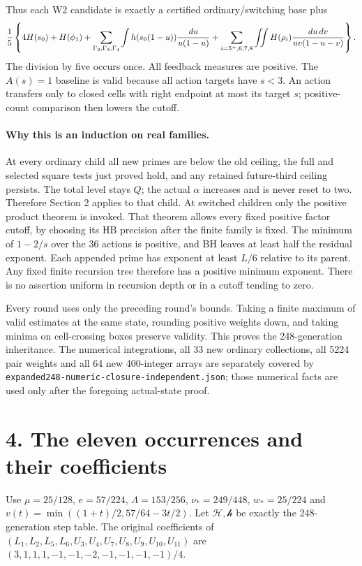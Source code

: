 \documentclass[11pt]{article}
\newcommand{\HH}{\mathcal H}
\newcommand{\hh}{\mathcal h}
\begin{document}
Thus each W2 candidate is exactly a certified ordinary/switching base
plus
\[
 {1\over5}\left\{4H(s_0)+H(\phi_1)
 +\sum_{\Gamma_2,\Gamma_3,\Gamma_4}\int h(s_0(1-u)){du\over u(1-u)}
 +\sum_{i=5^+,6,7,8}\iint H(\rho_i){du\,dv\over uv(1-u-v)}\right\}.
\]
The division by five occurs once. All feedback measures are positive.
The $A(s)=1$ baseline is valid because all action targets have $s<3$.
An action transfers only to closed cells with right endpoint at most
its target $s$; positive-count comparison then lowers the cutoff.

\paragraph{Why this is an induction on real families.}
At every ordinary child all new primes are below the old ceiling,
the full and selected square tests just proved hold, and any retained
future-third ceiling persists. The total level stays $Q$; the actual
$\alpha$ increases and is never reset to two. Therefore Section 2
applies to that child. At switched children only the positive product
theorem is invoked. That theorem allows every fixed positive factor
cutoff, by choosing its HB precision after the finite family is fixed.
The minimum of $1-2/s$ over the 36 actions is positive, and BH leaves
at least half the residual exponent. Each appended prime has exponent
at least $L/6$ relative to its parent. Any fixed finite recursion tree
therefore has a positive minimum exponent. There is no assertion
uniform in recursion depth or in a cutoff tending to zero.

Every round uses only the preceding round's bounds. Taking a finite
maximum of valid estimates at the same state, rounding positive weights
down, and taking minima on cell-crossing boxes preserve validity.
This proves the 248-generation inheritance. The numerical integrations,
all 33 new ordinary collections, all 5224 pair weights and all 64 new
400-integer arrays are separately covered by
\texttt{expanded248-numeric-closure-independent.json}; those numerical
facts are used only after the foregoing actual-state proof.

\section*{4. The eleven occurrences and their coefficients}
Use $\mu=25/128$, $e=57/224$, $\Lambda=153/256$,
$\nu_*=249/448$, $w_*=25/224$ and
$v(t)=\min((1+t)/2,57/64-3t/2)$. Let $\HH,\hh$ be exactly the
248-generation step table. The original coefficients of
$(L_1,L_2,L_5,L_6,U_3,U_4,U_7,U_8,U_9,U_{10},U_{11})$
are $(3,1,1,1,-1,-1,-2,-1,-1,-1,-1)/4$.
\end{document}
